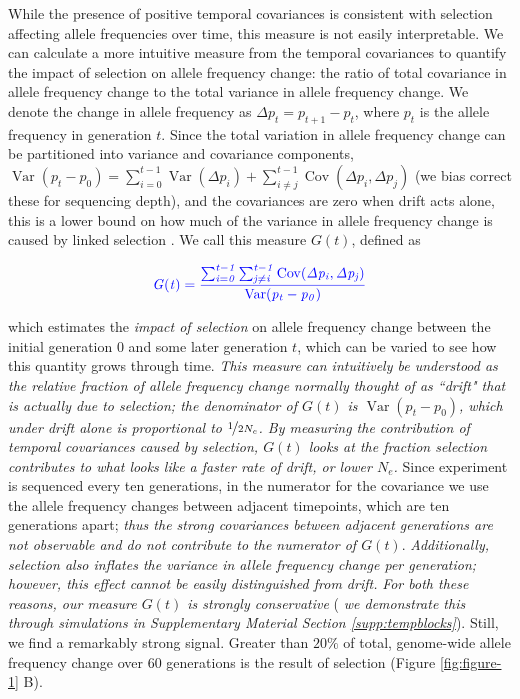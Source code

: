 \documentclass[11pt]{article}
\newcommand{\vb}[1]{{\it \color{blue} #1}}
\DeclareMathOperator{\var}{Var}
\DeclareMathOperator{\cov}{Cov}
\begin{document}
While the presence of positive temporal covariances is consistent with
selection affecting allele frequencies over time, this measure is not easily
interpretable. We can calculate a more intuitive measure from the temporal
covariances to quantify the impact of selection on allele frequency change: the
ratio of total covariance in allele frequency change to the total variance in
allele frequency change. We denote the change in allele frequency as $\Delta
p_t = p_{t+1}-p_t$, where $p_t$ is the allele frequency in generation $t$.
Since the total variation in allele frequency change can be partitioned into
variance and covariance components, $\var(p_t - p_0) = \sum_{i=0}^{t-1}
\var(\Delta p_i) + \sum_{i \ne j}^{t-1} \cov(\Delta p_i, \Delta p_j)$ (we bias
correct these for sequencing depth), and the covariances are zero when drift
acts alone, this is a lower bound on how much of the variance in allele
frequency change is caused by linked selection \parencite{Buffalo2019-io}. We
call this measure $G(t)$, defined as

\begin{align}
  \vb{G(t) = \frac{ \sum_{i=0}^{t-1} \sum_{j \ne i}^{t-1} \cov(\Delta p_i, \Delta p_j)}{\var(p_t - p_0)}}
\end{align}
%

which estimates the \vb{impact of selection} on allele frequency change between
the initial generation $0$ and some later generation $t$, which can be varied
to see how this quantity grows through time. \vb{This measure can intuitively
  be understood as the relative fraction of allele frequency change normally
  thought of as ``drift" that is actually due to selection; the denominator of
  $G(t)$ is $\var(p_t - p_0)$, which under drift alone is proportional to
  $\nicefrac{1}{2 N_e}$. By measuring the contribution of temporal covariances
caused by selection, $G(t)$ looks at the fraction selection contributes to what
looks like a faster rate of drift, or lower $N_e$.} Since
\textcite{Barghi2019-qy} experiment is sequenced every ten generations, in the
numerator for the covariance we use the allele frequency changes between
adjacent timepoints, which are ten generations apart; \vb{thus the strong
  covariances between adjacent generations are not observable and do not
  contribute to the numerator of $G(t)$}. \vb{Additionally, selection also
  inflates the variance in allele frequency change per generation; however,
  this effect cannot be easily distinguished from drift.} \vb{For both these
reasons, our measure $G(t)$ is strongly conservative} (\vb{we demonstrate this
through simulations in Supplementary Material Section \ref{supp:tempblocks}}).
Still, we find a remarkably strong signal. Greater than $20\%$ of total,
genome-wide allele frequency change over 60 generations is the result of
selection (Figure \ref{fig:figure-1} B).
\end{document}
